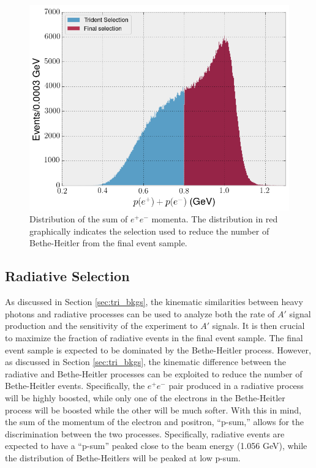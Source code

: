 \begin{figure}[ht]
    \centering
    \includegraphics[width=\textwidth]{images/psum.png}
    \caption{Distribution of the sum of $e^+e^-$ momenta.  The distribution in 
             red graphically indicates the selection used to reduce the number
             of Bethe-Heitler from the final event sample.}
    \label{fig:p_sum}
\end{figure}  

\subsection{Radiative Selection}

As discussed in Section \ref{sec:tri_bkgs}, the kinematic similarities between
heavy photons and
radiative processes can be used to analyze both the rate of $A'$ signal production
and the sensitivity of the experiment to $A'$ signals.  It is then crucial to
maximize the fraction of radiative events in the final event sample.  The final
event sample is expected to be dominated by the Bethe-Heitler process.  However,
as discussed in Section \ref{sec:tri_bkgs}, 
the kinematic difference between the radiative and Bethe-Heitler processes can 
be exploited to reduce the number of Bethe-Heitler events.  Specifically, the 
$e^+e^-$ pair produced in a radiative process will be highly boosted, while 
only one of the electrons in the Bethe-Heitler process will be boosted 
while the other will be much softer.  With this in mind, the sum of the momentum
of the electron and positron, ``p-sum,'' allows for the discrimination between the two processes.
Specifically, radiative events are expected to have a ``p-sum'' peaked 
close to the beam energy (1.056 GeV), while the distribution of Bethe-Heitlers 
will be peaked at low p-sum.

